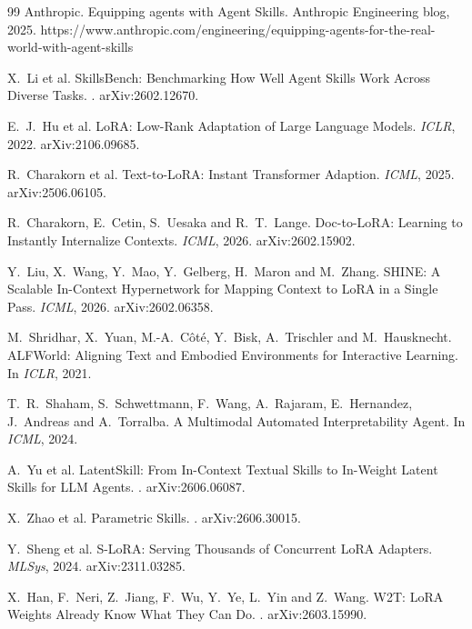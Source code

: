 \documentclass[11pt]{article}
\begin{document}
\begin{thebibliography}{99}
 Anthropic.
\newblock Equipping agents with Agent Skills.
\newblock Anthropic Engineering blog, 2025. https://www.anthropic.com/engineering/equipping-agents-for-the-real-world-with-agent-skills

 X.~Li et al.
\newblock SkillsBench: Benchmarking How Well Agent Skills Work Across Diverse Tasks.
. arXiv:2602.12670.

 E.~J.~Hu et al.
\newblock LoRA: Low-Rank Adaptation of Large Language Models.
\newblock \emph{ICLR}, 2022. arXiv:2106.09685.

 R.~Charakorn et al.
\newblock Text-to-LoRA: Instant Transformer Adaption.
\newblock \emph{ICML}, 2025. arXiv:2506.06105.

 R.~Charakorn, E.~Cetin, S.~Uesaka and R.~T.~Lange.
\newblock Doc-to-LoRA: Learning to Instantly Internalize Contexts.
\newblock \emph{ICML}, 2026. arXiv:2602.15902.

 Y.~Liu, X.~Wang, Y.~Mao, Y.~Gelberg, H.~Maron and M.~Zhang.
\newblock SHINE: A Scalable In-Context Hypernetwork for Mapping Context to LoRA in a Single Pass.
\newblock \emph{ICML}, 2026. arXiv:2602.06358.

 M.~Shridhar, X.~Yuan, M.-A.~C\^ot\'e, Y.~Bisk, A.~Trischler and M.~Hausknecht.
\newblock ALFWorld: Aligning Text and Embodied Environments for Interactive Learning.
\newblock In \emph{ICLR}, 2021.

 T.~R.~Shaham, S.~Schwettmann, F.~Wang, A.~Rajaram, E.~Hernandez, J.~Andreas and A.~Torralba.
\newblock A Multimodal Automated Interpretability Agent.
\newblock In \emph{ICML}, 2024.

 A.~Yu et al.
\newblock LatentSkill: From In-Context Textual Skills to In-Weight Latent Skills for LLM Agents.
. arXiv:2606.06087.

 X.~Zhao et al.
\newblock Parametric Skills.
. arXiv:2606.30015.

 Y.~Sheng et al.
\newblock S-LoRA: Serving Thousands of Concurrent LoRA Adapters.
\newblock \emph{MLSys}, 2024. arXiv:2311.03285.

 X.~Han, F.~Neri, Z.~Jiang, F.~Wu, Y.~Ye, L.~Yin and Z.~Wang.
\newblock W2T: LoRA Weights Already Know What They Can Do.
. arXiv:2603.15990.


\end{thebibliography}
\end{document}
